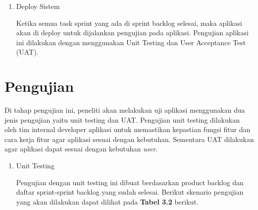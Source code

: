 \begin{spacing}{1.5}
\begin{enumerate}
	\item Deploy Sistem
	
	Ketika semua task sprint yang ada di sprint backlog selesai, maka aplikasi akan di deploy untuk dijalankan pengujian pada aplikasi. Pengujian aplikasi ini dilakukan dengan menggunakan Unit Testing dan User Acceptance Test (UAT).
	
\end{enumerate}

\section{Pengujian}

Di tahap pengujian ini, peneliti akan melakukan uji aplikasi menggunakan dua jenis pengujian yaitu unit testing dan UAT. Pengujian unit testing dilakukan oleh tim internal developer aplikasi untuk memastikan kepastian fungsi fitur dan cara kerja fitur agar aplikasi sesuai dengan kebutuhan. Sementara UAT dilakukan agar aplikasi dapat sesuai dengan kebutuhan \textit{user}.

\begin{enumerate}
	\item Unit Testing
	
	Pengujian dengan unit testing ini dibuat berdasarkan product backlog dan daftar sprint-sprint backlog yang sudah selesai. Berikut skenario pengujian yang akan dilakukan dapat dilihat pada \textbf{Tabel 3.2} berikut.


\end{enumerate}
\end{spacing}
